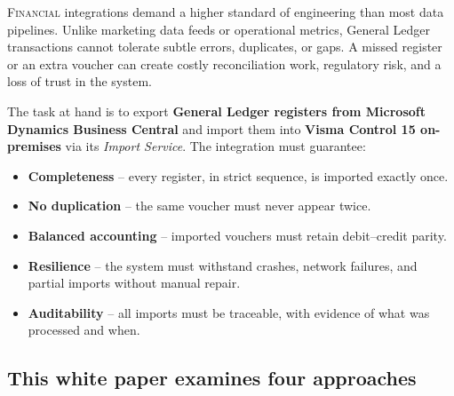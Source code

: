 \documentclass[11pt, a4paper, twocolumn]{article} %
\begin{document}





\color{white}



\lettrine[lines=3,lhang=0.1,findent=1pt]{F}{inancial} integrations demand a higher standard of engineering than most data pipelines. Unlike marketing data feeds or operational metrics, General Ledger transactions cannot tolerate subtle errors, duplicates, or gaps. A missed register or an extra voucher can create costly reconciliation work, regulatory risk, and a loss of trust in the system.

The task at hand is to export \textbf{General Ledger registers from Microsoft Dynamics Business Central} and import them into \textbf{Visma Control 15 on-premises} via its \textit{Import Service}. The integration must guarantee:

\begin{itemize}[leftmargin=*, nosep]
\item \textbf{Completeness} – every register, in strict sequence, is imported exactly once.
\item \textbf{No duplication} – the same voucher must never appear twice.
\item \textbf{Balanced accounting} – imported vouchers must retain debit–credit parity.
\item \textbf{Resilience} – the system must withstand crashes, network failures, and partial imports without manual repair.
\item \textbf{Auditability} – all imports must be traceable, with evidence of what was processed and when.
\end{itemize}

\subsection*{This white paper examines four approaches}
\end{document}
